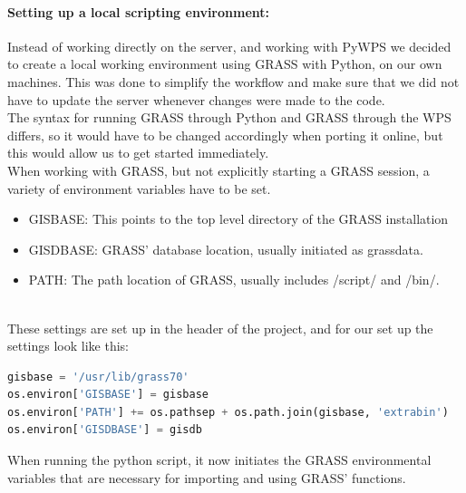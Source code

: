 \paragraph{Setting up a local scripting environment:} Instead of working directly on the server, and working with PyWPS we decided to create a local working environment using GRASS with Python, on our own machines. This was done to simplify the workflow and make sure that  we did not have to update the server whenever changes were made to the code. \\
The syntax for running GRASS through Python and GRASS through the WPS differs, so it would have to be changed accordingly when porting it online, but this would allow us to get started immediately. \\
When working with GRASS, but not explicitly starting a GRASS session, a variety of environment variables have to be set. 

\begin{itemize}
\item \textsc{GISBASE}: This points to the top level directory of the GRASS installation
\item \textsc{GISDBASE}: GRASS' database location, usually initiated as grassdata.
\item \textsc{PATH}: The path location of GRASS, usually includes /script/ and /bin/.
\end{itemize} \\

These settings are set up in the header of the project, and for our set up the settings look like this:

\begin{lstlisting}[language=Python]
gisbase = '/usr/lib/grass70'
os.environ['GISBASE'] = gisbase
os.environ['PATH'] += os.pathsep + os.path.join(gisbase, 'extrabin')
os.environ['GISDBASE'] = gisdb
\end{lstlisting}

When running the python script, it now initiates the GRASS environmental variables that are necessary for importing and using GRASS' functions.\\

